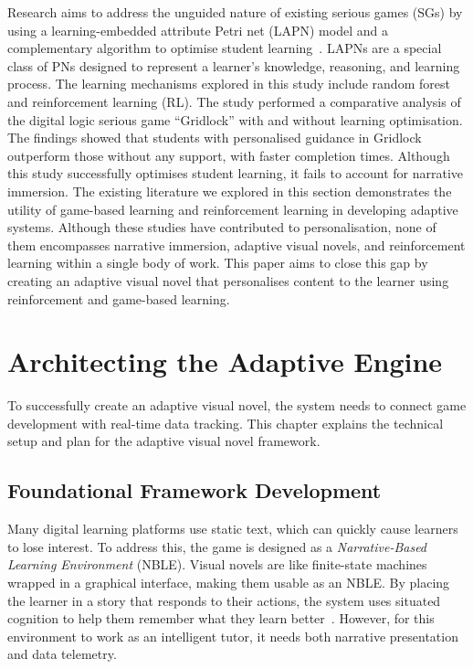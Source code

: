 \documentclass[12pt,a4paper]{report}
\begin{document}
\quad Research aims to address the unguided nature of existing serious games (SGs) by using a learning-embedded attribute Petri net (LAPN) model and a complementary algorithm to optimise student learning~\cite{16}. LAPNs are a special class of PNs designed to represent a learner’s knowledge, reasoning, and learning process. The learning mechanisms explored in this study include random forest and reinforcement learning (RL). The study performed a comparative analysis of the digital logic serious game “Gridlock” with and without learning optimisation. The findings showed that students with personalised guidance in Gridlock outperform those without any support, with faster completion times. Although this study successfully optimises student learning, it fails to account for narrative immersion.
The existing literature we explored in this section demonstrates the utility of game-based learning and reinforcement learning in developing adaptive systems. Although these studies have contributed to personalisation, none of them encompasses narrative immersion, adaptive visual novels, and reinforcement learning within a single body of work. This paper aims to close this gap by creating an adaptive visual novel that personalises content to the learner using reinforcement and game-based learning.



\chapter{Architecting the Adaptive Engine}

To successfully create an adaptive visual novel, the system needs to connect game development with real-time data tracking. This chapter explains the technical setup and plan for the adaptive visual novel framework.


\section{Foundational Framework Development}

\quad Many digital learning platforms use static text, which can quickly cause learners to lose interest. To address this, the game is designed as a \textit{Narrative-Based Learning Environment} (NBLE). Visual novels are like finite-state machines wrapped in a graphical interface, making them usable as an NBLE. By placing the learner in a story that responds to their actions, the system uses situated cognition to help them remember what they learn better~\cite{CJ}. However, for this environment to work as an intelligent tutor, it needs both narrative presentation and data telemetry.
\end{document}

